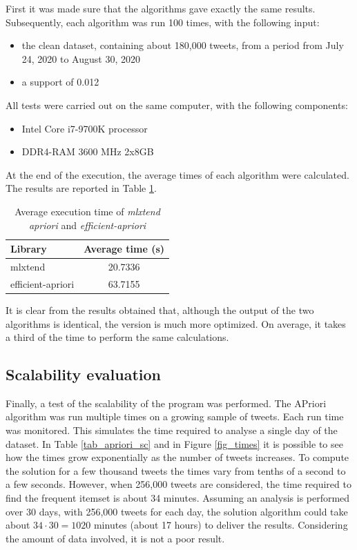 First it was made sure that the algorithms gave exactly the same results. Subsequently, each algorithm was run 100 times, with the following input:
\begin{itemize}
  \item the clean dataset, containing about 180,000 tweets, from a period from July 24, 2020 to August 30, 2020
  \item a support of 0.012
\end{itemize}

All tests were carried out on the same computer, with the following components:
\begin{itemize}
  \item Intel Core i7-9700K processor
  \item DDR4-RAM 3600 MHz 2x8GB
\end{itemize}


At the end of the execution, the average times of each algorithm were calculated. The results are reported in Table \ref{tab_apriori_times}.

\begin{table}[h]
  \centering
  \begin{tabular}{@{}lc@{}}
  \toprule
  \textbf{Library}     & \textbf{Average time (s)}                                         \\ \midrule
  mlxtend              & 20.7336 \\
  efficient-apriori    & 63.7155 \\ \bottomrule
  \end{tabular}
  \caption{Average execution time of \textit{mlxtend apriori} and \textit{efficient-apriori}}
  \label{tab_apriori_times}
\end{table}

It is clear from the results obtained that, although the output of the two algorithms is identical, the  version is much more optimized. On average, it takes a third of the time to perform the same calculations.


\subsection*{Scalability evaluation}
Finally, a test of the scalability of the program was performed. The APriori algorithm was run multiple times on a growing sample of tweets. Each run time was monitored. This simulates the time required to analyse a single day of the dataset. In Table \ref{tab_apriori_sc} and in Figure \ref{fig_times} it is possible to see how the times grow exponentially as the number of tweets increases. To compute the solution for a few thousand tweets the times vary from tenths of a second to a few seconds. However, when 256,000 tweets are considered, the time required to find the frequent itemset is about 34 minutes. Assuming an analysis is performed over 30 days, with 256,000 tweets for each day, the solution algorithm could take about $34 \cdot 30 = 1020$ minutes (about 17 hours) to deliver the results.  Considering the amount of data involved, it is not a poor result.

